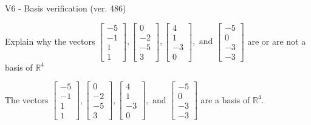 \begin{exercise}
  \begin{exerciseTitle}V6 - Basis verification (ver. 486)\end{exerciseTitle}
  \begin{exerciseStatement}
    Explain why the vectors \(\left[\begin{array}{r}
-5 \\
-1 \\
1 \\
1
\end{array}\right] , \left[\begin{array}{r}
0 \\
-2 \\
-5 \\
3
\end{array}\right] , \left[\begin{array}{r}
4 \\
1 \\
-3 \\
0
\end{array}\right] , \text{ and } \left[\begin{array}{r}
-5 \\
0 \\
-3 \\
-3
\end{array}\right]\) are or are not a basis of \(\mathbb{R}^4\)	


  \end{exerciseStatement}
  \begin{exerciseAnswer}
   The vectors \(\left[\begin{array}{r}
-5 \\
-1 \\
1 \\
1
\end{array}\right] , \left[\begin{array}{r}
0 \\
-2 \\
-5 \\
3
\end{array}\right] , \left[\begin{array}{r}
4 \\
1 \\
-3 \\
0
\end{array}\right] , \text{ and } \left[\begin{array}{r}
-5 \\
0 \\
-3 \\
-3
\end{array}\right]\) 
  	 are  a basis of \(\mathbb{R}^4\).
  


  \end{exerciseAnswer}
\end{exercise}
